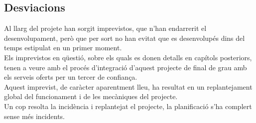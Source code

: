 \subsection{Desviacions}
Al llarg del projete han sorgit imprevistos, que n'han endarrerit el desenvolupament, però que per sort no han evitat que es desenvolupés dins del temps estipulat en un primer moment.\\
\newline Els imprevistos en qüestió, sobre els quals es donen detalls en capítols posteriors, tenen a veure amb el procés d'integració d'aquest projecte de final de grau amb els serveis oferts per un tercer de confiança.\\
\newline Aquest imprevist, de caràcter aparentment lleu, ha resultat en un replantejament global del funcionament i de les mecàniques del projecte.\\
\newlien Un cop resolta la incidència i replantejat el projecte, la planificació s'ha complert sense més incidents.
